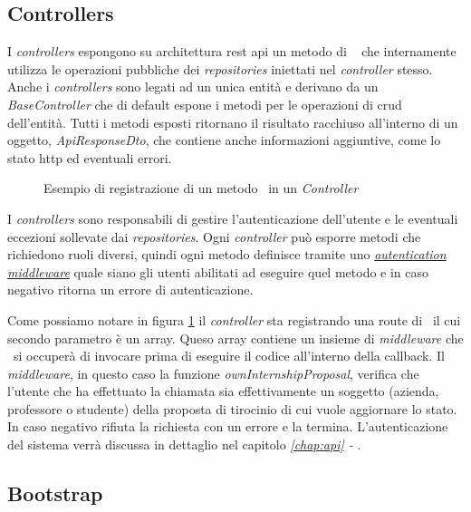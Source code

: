 \pagebreak
\subsection{Controllers}
\label{server:controllers}
I \textit{controllers} espongono su architettura \acrshort{rest} \acrshort{api} un metodo di \expressjs~ che internamente utilizza le operazioni pubbliche dei \textit{repositories} iniettati nel \textit{controller} stesso. Anche i \textit{controllers} sono legati ad un unica entità e derivano da un \textit{BaseController} che di default espone i metodi per le operazioni di \acrshort{crud} dell'entità. 
Tutti i metodi esposti ritornano il risultato racchiuso all'interno di un oggetto, \textit{ApiResponseDto}, che contiene anche informazioni aggiuntive, come lo stato \acrshort{http} ed eventuali errori.

\begin{figure}[H] 
	\centering    
	
	\caption[Esempio di registrazione di un metodo \expressjs~in un \textit{Controller}]{Esempio di registrazione di un metodo \expressjs~in un \textit{Controller}}
	\label{fig:server-controller-1}
\end{figure}
\noindent
I \textit{controllers} sono responsabili di gestire l'autenticazione dell'utente e le eventuali eccezioni sollevate dai \textit{repositories}. Ogni \textit{controller} può esporre metodi che richiedono ruoli diversi, quindi ogni metodo definisce tramite uno \textit{\hyperref[server:scopes]{autentication middleware}} quale siano gli utenti abilitati ad eseguire quel metodo e in caso negativo ritorna un errore di autenticazione.

\noindent
Come possiamo notare in figura \ref{fig:server-controller-1} il \textit{controller} sta registrando una route di \expressjs~il cui  secondo parametro è un array. Queso array contiene un insieme di \textit{middleware} che \expressjs~si occuperà di invocare prima di eseguire il codice all'interno della \gls{callback}. Il \textit{middleware}, in questo caso la funzione \textit{ownInternshipProposal}, verifica che l'utente che ha effettuato la chiamata sia effettivamente un soggetto (azienda, professore o studente) della proposta di tirocinio di cui vuole aggiornare lo stato. In caso negativo rifiuta la richiesta con un errore e la termina. L'autenticazione del sistema verrà discussa in dettaglio nel capitolo \textit{\ref{chap:api} - }.

\pagebreak
\subsection{Bootstrap}

